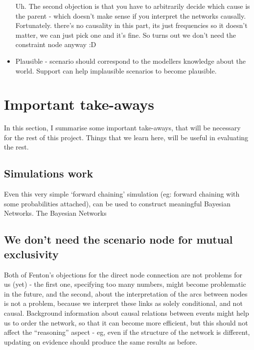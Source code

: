 \begin{itemize}
Uh. The second objection is that you have to arbitrarily decide which cause is the parent - which doesn't make sense if you interpret the networks causally. Fortunately. there's no causality in this part, its just frequencies so it doesn't matter, we can just pick one and it's fine. So turns out we don't need the constraint node anyway :D

\item Plausible - scenario should correspond to the modellers knowledge about the world. Support can help implausible scenarios to become plausible.


\end{itemize}

\section{Important take-aways}
In this section, I summarise some important take-aways, that will be necessary for the rest of this project. Things that we learn here, will be useful in evaluating the rest.

\subsection{Simulations work}
Even this very simple `forward chaining' simulation (eg: forward chaining with some probabilities attached), can be used to construct meaningful Bayesian Networks. The Bayesian Networks 


\subsection{We don't need the scenario node for mutual exclusivity}
Both of Fenton's objections for the direct node connection are not problems for us (yet) - the first one, specifying too many numbers, might become problematic in the future, and the second, about the interpretation of the arcs between nodes is not a problem, because we interpret these links as solely conditional, and not causal. Background information about causal relations between events might help us to order the network, so that it can become more efficient, but this should not affect the ``reasoning'' aspect - eg, even if the structure of the network is different, updating on evidence should produce the same results as before.


